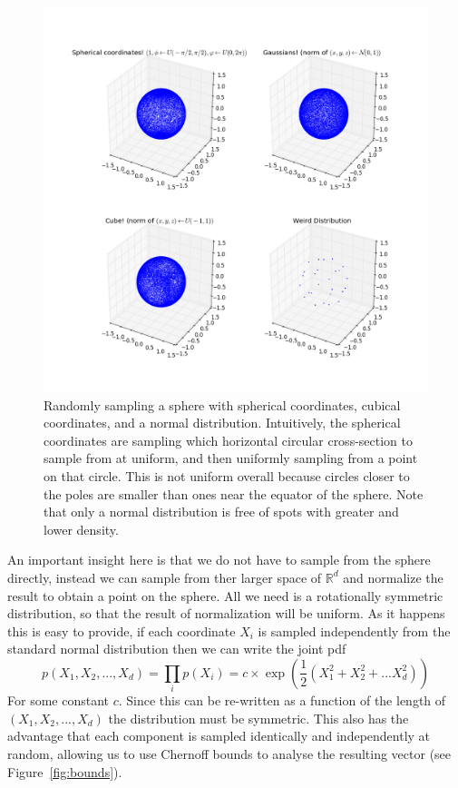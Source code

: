 \documentclass[11pt]{article}
\newcommand{\R}{\mathbb{R}}
\begin{document}
\begin{figure}[H]
  \begin{center}
    \includegraphics[width=0.9\linewidth]{spheres.png}
  \end{center}

  \caption{Randomly sampling a sphere with spherical coordinates, cubical
    coordinates, and a normal distribution. Intuitively, the spherical
    coordinates are sampling which horizontal circular cross-section to sample
    from at uniform, and then uniformly sampling from a point on that circle.
    This is not uniform overall because circles closer to the poles are smaller
    than ones near the equator of the sphere. Note that only a normal distribution
    is free of spots with greater and lower density.}

  \label{fig:spheres}
\end{figure}

An important insight here is that we do not have to sample from the sphere directly, instead we can sample from ther larger space of $\R^d$ and normalize the result to obtain a point on the sphere. All we need is a rotationally symmetric distribution, so that the result of normalization will be uniform. As it happens this is easy to provide, if each coordinate $X_i$ is sampled independently from the standard normal distribution then we can write the joint pdf
\[ p(X_1,X_2,...,X_d) = \prod_{i} p(X_i) = c \times \exp(\frac{1}{2} (X_1^2 + X_2^2 + ... X_d^2)) \]
For some constant $c$. Since this can be re-written as a function of the length of $(X_1,X_2,...,X_d)$ the distribution must be symmetric. This also has the advantage that each component is sampled identically and independently at random, allowing us to use Chernoff bounds to analyse the resulting vector (see Figure~\ref{fig:bounds}).
\end{document}
